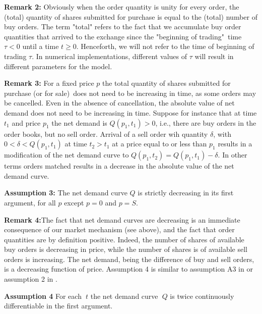\documentclass{article}
\begin{document}
\bigskip

\textbf{Remark 2:} Obviously when the order quantity is unity for every
order, the (total) quantity of shares submitted for purchase is equal to the
(total) number of buy orders. The term "total" refers to the fact that we
accumulate buy order quantities that arrived to the exchange since the
"beginning of trading"\ time $\tau <0$ until a time $t\geq 0$. Henceforth,
we will not refer to the time of beginning of trading $\tau $. In numerical
implementations, different values of $\tau $ will result in different
parameters for the model.

\bigskip \bigskip

\textbf{Remark 3:} For a fixed price $p$ the total quantity of shares
submitted for purchase (or for sale)\ does not need to be increasing in
time, as some orders may be cancelled. Even in the absence of cancellation,
the absolute value of net demand does not need to be increasing in time.
Suppose for instance that at time $t_{1}$ and price $p_{1}$ the net demand
is $Q(p_{1},t_{1})>0$, i.e., there are buy orders in the order books, but no
sell order. Arrival of a sell order wih quantity $\delta $, with $0<\delta
<Q(p_{1},t_{1})$ at time $t_{2}>t_{1}$ at a price equal to or less than $%
p_{1}$ results in a modification of the net demand curve to $%
Q(p_{1},t_{2})=Q(p_{1},t_{1})-\delta $. In other terms orders matched
results in a decrease in the absolute value of the net demand curve.

\bigskip

\textbf{Assumption 3: }The net demand curve $Q$ is strictly decreasing in
its first argument, for all $p$ except $p=0$ and $p=S$.

\bigskip

\textbf{Remark 4:}The fact that net demand curves are decreasing is an
immediate consequence of our market mechanism (see above), and the fact that
order quantities are by definition positive. Indeed, the number of shares of
available buy orders is decreasing in price, while the number of shares is
of available sell orders is increasing. The net demand, being the difference
of buy and sell orders, is a decreasing function of price. Assumption 4 is
similar to assumption A3 in \cite{Jar92} or assumption 2 in \cite{BB04}.

\bigskip

\textbf{Assumption 4 }For each\textbf{\ }$t$ the net demand curve\textbf{\ }$%
Q$ is twice continuously differentiable in the first argument.

\bigskip
\end{document}
